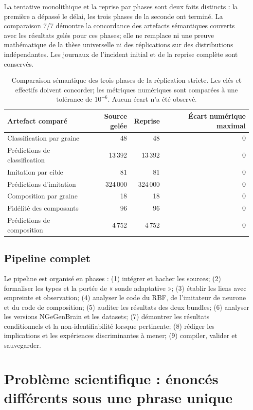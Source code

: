 \documentclass[11pt,a4paper,oneside]{report}
\begin{document}
La tentative monolithique et la reprise par phases sont deux faits distincts : la première a dépassé le délai, les trois phases de la seconde ont terminé. La comparaison 7/7 démontre la concordance des artefacts sémantiques couverts avec les résultats gelés pour ces phases; elle ne remplace ni une preuve mathématique de la thèse universelle ni des réplications sur des distributions indépendantes. Les journaux de l'incident initial et de la reprise complète sont conservés.

\begin{table}[htbp]
\centering
\small
\begin{tabular}{lrrr}
\toprule
Artefact comparé & Source gelée & Reprise & Écart numérique maximal\\
\midrule
Classification par graine & 48 & 48 & 0\\
Prédictions de classification & 13\,392 & 13\,392 & 0\\
Imitation par cible & 81 & 81 & 0\\
Prédictions d'imitation & 324\,000 & 324\,000 & 0\\
Composition par graine & 18 & 18 & 0\\
Fidélité des composants & 96 & 96 & 0\\
Prédictions de composition & 4\,752 & 4\,752 & 0\\
\bottomrule
\end{tabular}
\caption{Comparaison sémantique des trois phases de la réplication stricte. Les clés et effectifs doivent concorder; les métriques numériques sont comparées à une tolérance de \(10^{-6}\). Aucun écart n'a été observé.}
\end{table}

\section{Pipeline complet}
Le pipeline est organisé en phases : (1) intégrer et hacher les sources; (2) formaliser les types et la portée de « sonde adaptative »; (3) établir les liens avec empreinte et observation; (4) analyser le code du RBF, de l'imitateur de neurone et du code de composition; (5) auditer les résultats des deux bundles; (6) analyser les versions NGeGenBrain et les datasets; (7) démontrer les résultats conditionnels et la non-identifiabilité lorsque pertinente; (8) rédiger les implications et les expériences discriminantes à mener; (9) compiler, valider et sauvegarder.

\chapter{Problème scientifique : énoncés différents sous une phrase unique}
\end{document}
